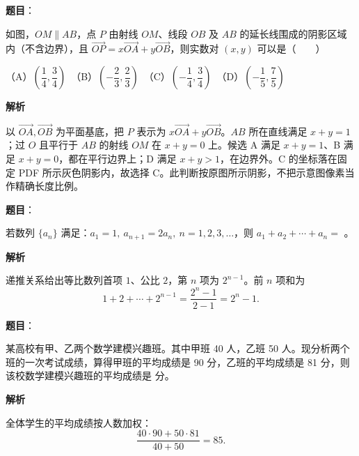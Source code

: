 \begin{answer}

\textbf{题目}：

如图，$OM\parallel AB$，点 $P$ 由射线 $OM$、线段 $OB$ 及 $AB$ 的延长线围成的阴影区域内（不含边界），且 $\overrightarrow{OP}=x\overrightarrow{OA}+y\overrightarrow{OB}$，则实数对 $(x,y)$ 可以是\mbox{（　　）}

（A）$\left(\dfrac14,\dfrac34\right)$　（B）$\left(-\dfrac23,\dfrac23\right)$　（C）$\left(-\dfrac14,\dfrac34\right)$　（D）$\left(-\dfrac15,\dfrac75\right)$
\nopagebreak[4]
\begin{center}\end{center}
\nopagebreak[4]
\textbf{解析}

以 $\overrightarrow{OA},\overrightarrow{OB}$ 为平面基底，把 $P$ 表示为 $x\overrightarrow{OA}+y\overrightarrow{OB}$。$AB$ 所在直线满足 $x+y=1$；过 $O$ 且平行于 $AB$ 的射线 $OM$ 在 $x+y=0$ 上。候选 A 满足 $x+y=1$、B 满足 $x+y=0$，都在平行边界上；D 满足 $x+y>1$，在边界外。C 的坐标落在固定 PDF 所示灰色阴影内，故选择 C。此判断按原图所示阴影，不把示意图像素当作精确长度比例。
\nopagebreak[4]
\begin{center}\end{center}
\nopagebreak[4]

\end{answer}
\begin{answer}

\textbf{题目}：

若数列 $\{a_n\}$ 满足：$a_1=1,\ a_{n+1}=2a_n,\ n=1,2,3,\ldots$，则 $a_1+a_2+\cdots+a_n=$ \gkblank{}。

\textbf{解析}

递推关系给出等比数列首项 $1$、公比 $2$，第 $n$ 项为 $2^{n-1}$。前 $n$ 项和为
\nopagebreak[4]
\[
1+2+\cdots+2^{n-1}=\frac{2^n-1}{2-1}=2^n-1.
\]


\end{answer}
\begin{answer}

\textbf{题目}：

某高校有甲、乙两个数学建模兴趣班。其中甲班 40 人，乙班 50 人。现分析两个班的一次考试成绩，算得甲班的平均成绩是 90 分，乙班的平均成绩是 81 分，则该校数学建模兴趣班的平均成绩是 \gkblank{} 分。

\textbf{解析}

全体学生的平均成绩按人数加权：
\nopagebreak[4]
\[
\frac{40\cdot90+50\cdot81}{40+50}=85.
\]


\end{answer}

